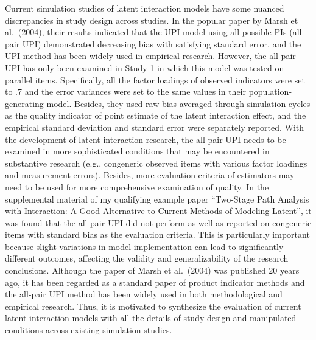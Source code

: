 \documentclass[
  man]{apa7}
\begin{document}
Current simulation studies of latent interaction models have some nuanced discrepancies in study design across studies. In the popular paper by Marsh et al.~(2004), their results indicated that the UPI model using all possible PIs (all-pair UPI) demonstrated decreasing bias with satisfying standard error, and the UPI method has been widely used in empirical research. However, the all-pair UPI has only been examined in Study 1 in which this model was tested on parallel items. Specifically, all the factor loadings of observed indicators were set to .7 and the error variances were set to the same values in their population-generating model. Besides, they used raw bias averaged through simulation cycles as the quality indicator of point estimate of the latent interaction effect, and the empirical standard deviation and standard error were separately reported. With the development of latent interaction research, the all-pair UPI needs to be examined in more sophisticated conditions that may be encountered in substantive research (e.g., congeneric observed items with various factor loadings and measurement errors). Besides, more evaluation criteria of estimators may need to be used for more comprehensive examination of quality. In the supplemental material of my qualifying example paper ``Two-Stage Path Analysis with Interaction: A Good Alternative to Current Methods of Modeling Latent'', it was found that the all-pair UPI did not perform as well as reported on congeneric items with standard bias as the evaluation criteria. This is particularly important because slight variations in model implementation can lead to significantly different outcomes, affecting the validity and generalizability of the research conclusions. Although the paper of Marsh et al.~(2004) was published 20 years ago, it has been regarded as a standard paper of product indicator methods and the all-pair UPI method has been widely used in both methodological and empirical research. Thus, it is motivated to synthesize the evaluation of current latent interaction models with all the details of study design and manipulated conditions across existing simulation studies.
\end{document}
